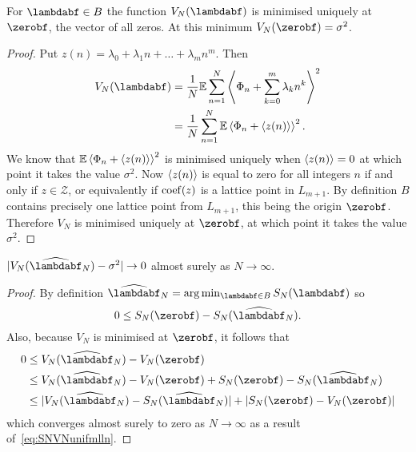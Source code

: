 \documentclass[journal]{IEEEtran}
\begin{document}
\begin{lemma}\label{lem:ES_Nminimisedzero}
For $\lambdabf \in B$ the function $V_N(\lambdabf)$ is minimised uniquely at $\zerobf$, the vector of all zeros.  At this minimum $V_N(\zerobf) = \sigma^2$.
\end{lemma}
\begin{proof}
Put $z(n) = \lambda_0 + \lambda_1 n + \dots + \lambda_m n^m$.  Then
\begin{align*}
V_N(\lambdabf) &= \frac{1}{N}\expect\sum_{n=1}^{N}\fracpart{ \Phi_n + \sum_{k=0}^m{\lambda_k n^k} }^2 \\
&= \frac{1}{N}\sum_{n=1}^{N}\expect\fracpart{ \Phi_n + \fracpart{z(n)} }^2.
\end{align*}
We know that ${\mathbb E}\left\langle  \Phi_n + \left\langle z(n) \right\rangle  \right\rangle^2$ is minimised uniquely when $\left\langle z(n) \right\rangle = 0$ at which point it takes the value $\sigma^2$. Now $\left\langle z(n) \right\rangle$ is equal to zero for all integers $n$ if and only if $z \in \mathcal{Z}$, or equivalently if $\operatorname{coef}(z)$ is a lattice point in $L_{m+1}$. By definition $B$ contains precisely one lattice point from $L_{m+1}$, this being the origin $\zerobf$. Therefore $V_N$ is minimised uniquely at $\zerobf$, at which point it takes the value $\sigma^2$.
\end{proof}

\begin{lemma} \label{lem:ESNconv}
$\sabs{V_N(\widehat{\lambdabf}_N) - \sigma^2} \rightarrow 0$ almost surely as $N \rightarrow \infty$.
\end{lemma}
\begin{proof}
By definition $\widehat{\lambdabf}_N =\arg\min_{\lambdabf\in B} S_N(\lambdabf)$ so 
\[
0 \leq S_{N}(\zerobf) - S_N(\widehat{\lambdabf}_N).
\]  
Also, because $V_N$ is minimised at $\zerobf$, it follows that 
\begin{align*}
0 &\leq V_N(\widehat{\lambdabf}_N) - V_N(\zerobf) \\
 &\leq V_N(\widehat{\lambdabf}_N) - V_N(\zerobf) + S_{N}(\zerobf) - S_N(\widehat{\lambdabf}_N)   \\
&\leq \sabs{ V_N(\widehat{\lambdabf}_N) - S_N(\widehat{\lambdabf}_N) } + \sabs{ S_{N}(\zerobf) - V_N(\zerobf) }
\end{align*}
which converges almost surely to zero as $N\rightarrow\infty$ as a result of~\eqref{eq:SNVNunifmlln}.
\end{proof}
\end{document}
